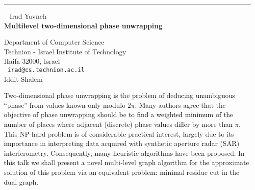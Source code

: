 \documentclass{report}
\begin{document}
\begin{center}

\rule{6in}{1pt} \
{\large
Irad Yavneh
\\ {\bf
Multilevel two-dimensional phase unwrapping
}}

Department of Computer Science \\
Technion - Israel Institute of Technology \\
Haifa 32000, Israel
\\ {\tt
irad@cs.technion.ac.il
}
\\
Iddit Shalem
\end{center}

Two-dimensional phase unwrapping is the problem of deducing unambiguous
``phase'' from values known only modulo $2\pi$. Many authors agree that
the objective of phase unwrapping should be to find a weighted minimum
of the number of places where adjacent (discrete) phase values differ
by more than $\pi$. This NP-hard problem is of considerable practical
interest, largely due to its importance in interpreting data acquired
with synthetic aperture radar (SAR) interferometry. Consequently, many
heuristic algorithms have been proposed. In this talk we shall present
a novel multi-level graph algorithm for the approximate solution of
this problem via an equivalent problem: minimal residue cut in the dual
graph.
\end{document}
